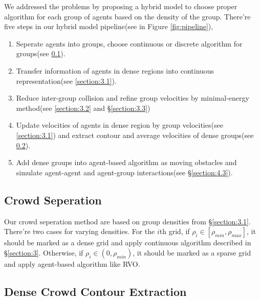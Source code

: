 \documentclass{egpubl}
\begin{document}
We addressed the problems by proposing a hybrid model to choose proper algorithm for each group of agents based on the density of the group. There're five steps in our hybrid model pipeline(see in Figure \ref{fig:pipeline}),
\begin{enumerate}
\item Seperate agents into groups, choose continuous or discrete algorithm for groups(see \ref{section:4.1}).
\item Transfer information of agents in dense regions into continuous representation(see \ref{section:3.1}).
\item Reduce inter-group collision and refine group velocities by minimal-energy method(see \ref{section:3.2} and \S\ref{section:3.3})
\item Update velocities of agents in dense region by group velocities(see \ref{section:3.1}) and extract contour and average velocities of dense groups(see \ref{section:4.2}).
\item Add dense groups into agent-based algorithm as moving obstacles and simulate agent-agent and agent-group interactions(see \S\ref{section:4.3}).
\end{enumerate}

\subsection{Crowd Seperation}
\label{section:4.1}

Our crowd seperation method are based on group densities from \S\ref{section:3.1}. There're two cases for varying densities. For the $i$th grid, if $\rho_i \in [\rho_{min}, \rho_{max}]$, it should be marked as a dense grid and apply continuous algorithm described in \S\ref{section:3}. Otherwise, if $\rho_i \in (0, \rho_{min})$, it should be marked as a sparse grid and apply agent-based algorithm like RVO.

\subsection{Dense Crowd Contour Extraction}
\label{section:4.2}
\end{document}
